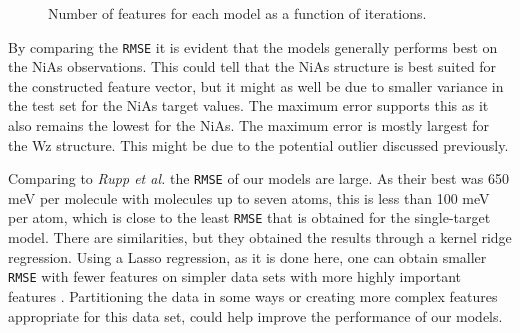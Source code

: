 \begin{figure}
    \centering
    \caption[Features versus iterations]{Number of features for each model as a function of iterations.}
    \label{fig:error_plot}
\end{figure}


By comparing the \texttt{RMSE} it is evident that the models generally performs best on the NiAs observations. This could tell that the NiAs structure is best suited for the constructed feature vector, but it might as well be due to smaller variance in the test set for the NiAs target values. The maximum error supports this as it also remains the lowest for the NiAs. The maximum error is mostly largest for the Wz structure. This might be due to the potential outlier discussed previously.

Comparing to \emph{Rupp et al.} \citep{rupp} the \texttt{RMSE} of our models are large. As their best was 650 meV per molecule with molecules up to seven atoms, this is less than 100 meV per atom, which is close to the least \texttt{RMSE} that is obtained for the single-target model. There are similarities, but they obtained the results through a kernel ridge regression. Using a Lasso regression, as it is done here, one can obtain smaller \texttt{RMSE} with fewer features on simpler data sets with more highly important features \citep{criticalrole_descriptor}. Partitioning the data in some ways or creating more complex features appropriate for this data set, could help improve the performance of our models. 






